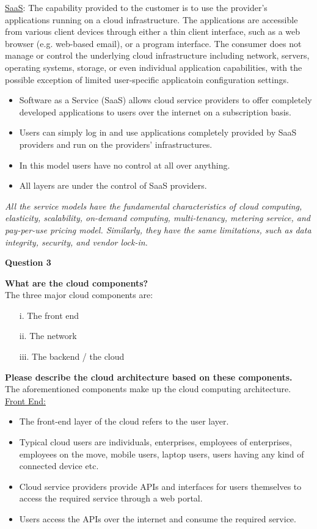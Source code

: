 \documentclass[a4paper, 12pt]{article}
\begin{document}
\underline{SaaS}: The capability provided to the customer is to use the provider's applications running on a cloud infrastructure. The applications are accessible from various client devices through either a thin client interface, such as a web browser (e.g. web-based email), or a program interface. The consumer does not manage or control the underlying cloud infrastructure including network, servers, operating systems, storage, or even individual application capabilities, with the possible exception of limited user-specific applicatoin configuration settings.
\begin{itemize}
\item
Software  as  a  Service  (SaaS)  allows  cloud  service  providers  to  offer  completely developed applications to users over the internet on a subscription basis. 
\item
Users can simply log in and use applications completely provided by SaaS providers and run on the providers’ infrastructures.
\item
In this model users have no control at all over anything.
\item
All layers are under the control of SaaS providers.
\end{itemize}

\textit{All the service models have the fundamental characteristics of cloud computing, elasticity, scalability, on-demand computing, multi-tenancy, metering service, and pay-per-use pricing model. Similarly, they have the same limitations, such as data integrity, security, and vendor lock-in.}

\newpage
\begin{center}
\textbf{Question 3}\\
\end{center}
\textbf{What are the cloud components?}\\
The three major cloud components are:
\begin{itemize}
\item[i.]
The front end
\item[ii.]
The network
\item[iii.]
The backend / the cloud
\end{itemize}

\textbf{Please describe the cloud architecture based on these components.}\\
The aforementioned components make up the cloud computing architecture.\\

\underline{Front End:}
\begin{itemize}
\item
The front-end layer of the cloud refers to the user layer.
\item
Typical cloud users are individuals, enterprises, employees of enterprises, employees on the move, mobile users, laptop users, users having any kind of connected device etc.
\item
Cloud service providers provide APIs and interfaces for users themselves to access the required service through a web portal.
\item
Users access the APIs over the internet and consume the required service.
\end{itemize}
\end{document}
